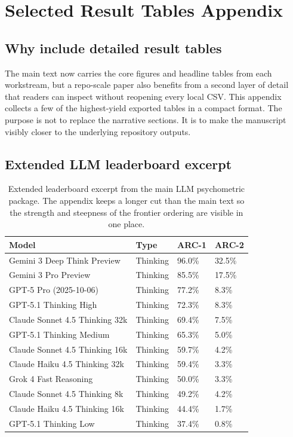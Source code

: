 \section{Selected Result Tables Appendix}

\subsection{Why include detailed result tables}

The main text now carries the core figures and headline tables from each workstream, but a repo-scale paper also benefits from a second layer of detail that readers can inspect without reopening every local CSV. This appendix collects a few of the highest-yield exported tables in a compact format. The purpose is not to replace the narrative sections. It is to make the manuscript visibly closer to the underlying repository outputs.

\subsection{Extended LLM leaderboard excerpt}

\begin{table}[H]
\centering
\scriptsize
\caption{Extended leaderboard excerpt from the main LLM psychometric package. The appendix keeps a longer cut than the main text so the strength and steepness of the frontier ordering are visible in one place.}
\begin{tabular}{p{2.45in}p{0.8in}p{0.8in}p{0.8in}}
\toprule
\textbf{Model} & \textbf{Type} & \textbf{ARC-1} & \textbf{ARC-2} \\
\midrule
Gemini 3 Deep Think Preview & Thinking & 96.0\% & 32.5\% \\
Gemini 3 Pro Preview & Thinking & 85.5\% & 17.5\% \\
GPT-5 Pro (2025-10-06) & Thinking & 77.2\% & 8.3\% \\
GPT-5.1 Thinking High & Thinking & 72.3\% & 8.3\% \\
Claude Sonnet 4.5 Thinking 32k & Thinking & 69.4\% & 7.5\% \\
GPT-5.1 Thinking Medium & Thinking & 65.3\% & 5.0\% \\
Claude Sonnet 4.5 Thinking 16k & Thinking & 59.7\% & 4.2\% \\
Claude Haiku 4.5 Thinking 32k & Thinking & 59.4\% & 3.3\% \\
Grok 4 Fast Reasoning & Thinking & 50.0\% & 3.3\% \\
Claude Sonnet 4.5 Thinking 8k & Thinking & 49.2\% & 4.2\% \\
Claude Haiku 4.5 Thinking 16k & Thinking & 44.4\% & 1.7\% \\
GPT-5.1 Thinking Low & Thinking & 37.4\% & 0.8\% \\
\bottomrule
\end{tabular}
\end{table}

